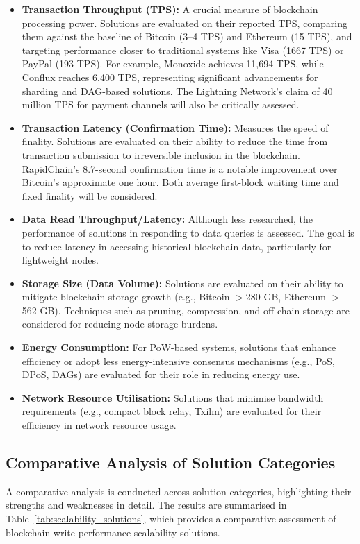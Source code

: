 \begin{itemize}
    \item \textbf{Transaction Throughput (TPS):} A crucial measure of blockchain processing power. Solutions are evaluated on their reported TPS, comparing them against the baseline of Bitcoin (3–4 TPS) and Ethereum (15 TPS), and targeting performance closer to traditional systems like Visa (1667 TPS) or PayPal (193 TPS). For example, Monoxide achieves 11,694 TPS, while Conflux reaches 6,400 TPS, representing significant advancements for sharding and DAG-based solutions. The Lightning Network’s claim of 40 million TPS for payment channels will also be critically assessed.
    \item \textbf{Transaction Latency (Confirmation Time):} Measures the speed of finality. Solutions are evaluated on their ability to reduce the time from transaction submission to irreversible inclusion in the blockchain. RapidChain’s 8.7-second confirmation time is a notable improvement over Bitcoin’s approximate one hour. Both average first-block waiting time and fixed finality will be considered.
    \item \textbf{Data Read Throughput/Latency:} Although less researched, the performance of solutions in responding to data queries is assessed. The goal is to reduce latency in accessing historical blockchain data, particularly for lightweight nodes.
    \item \textbf{Storage Size (Data Volume):} Solutions are evaluated on their ability to mitigate blockchain storage growth (e.g., Bitcoin $>$280 GB, Ethereum $>$562 GB). Techniques such as pruning, compression, and off-chain storage are considered for reducing node storage burdens.
    \item \textbf{Energy Consumption:} For PoW-based systems, solutions that enhance efficiency or adopt less energy-intensive consensus mechanisms (e.g., PoS, DPoS, DAGs) are evaluated for their role in reducing energy use.
    \item \textbf{Network Resource Utilisation:} Solutions that minimise bandwidth requirements (e.g., compact block relay, Txilm) are evaluated for their efficiency in network resource usage.
\end{itemize}

\subsection{Comparative Analysis of Solution Categories}
A comparative analysis is conducted across solution categories, highlighting their strengths and weaknesses in detail. The results are summarised in Table~\ref{tab:scalability_solutions}, which provides a comparative assessment of blockchain write-performance scalability solutions.

